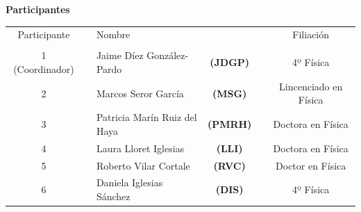 \documentclass[11pt]{extarticle}
\begin{document}
\begin{titlepage}
\begin{center}
			\vspace{1cm}

			\textbf{Participantes}

			\begin{table}[H]
				\centering
				\begin{tabular}{ c c l c c c}
					\centering
						Participante 	& & Nombre 							&					& & Filiación 				\\
										& &									&					& &							\\ 
						1 (Coordinador) & & Jaime Díez González-Pardo 		& \textbf{(JDGP)}	& & 4º Física 				\\ 
						2 				& & Marcos Seror García 			& \textbf{(MSG)}	& & Lincenciado en Física 	\\ 
						3 				& & Patricia Marín Ruiz del Haya 	& \textbf{(PMRH)}	& & Doctora en Física 		\\ 
						4 				& & Laura Lloret Iglesias 			& \textbf{(LLI)}	& & Doctora en Física 		\\ 
						5 				& & Roberto Vilar Cortale 			& \textbf{(RVC)}	& & Doctor en Física 		\\ 
						6 				& & Daniela Iglesias Sánchez		& \textbf{(DIS)}	& & 4º Física 				\\ 
				\end{tabular}
			\end{table}

			\vfill


		\end{center}
	\end{titlepage}


\end{document}
